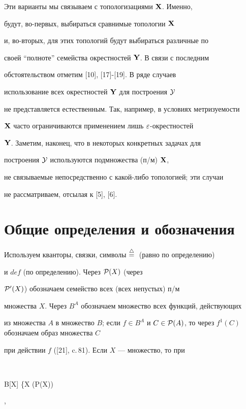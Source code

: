 Эти варианты мы связываем с топологизациями ${\bold X}$. Именно,


будут, во-первых, выбираться сравнимые топологии ${\bold X}$


и, во-вторых, для этих топологий будут выбираться различные по


своей ``полноте'' семейства окрестностей ${\bold Y}$. В связи с последним


обстоятельством отметим [10], [17]-[19]. В ряде случаев


использование всех окрестностей ${\bold Y}$ для построения ${\cal Y}$


не представляется естественным. Так, например, в условиях метризуемости


${\bold X}$ часто ограничиваются применением лишь $\varepsilon$-окрестностей


${\bold Y}$. Заметим, наконец, что в некоторых конкретных задачах для


построения ${\cal Y}$ используются подмножества (п/м) ${\bold X}$,


не связываемые непосредственно с какой-либо топологией; эти случаи


не рассматриваем, отсылая к [5], [6].





\section{Общие определения и обозначения}





Используем кванторы, связки, символы $\overset{\triangle}{=}{}$ (равно по определению)


и $def$ (по определению). Через ${{\cal P}(X)}$ (через


${{\cal P}'}(X)$) обозначаем семейство всех (всех непустых) п/м


множества $X$. Через $B^A$ обозначаем множество всех функций, действующих


из множества $A$ в множество $B$; если $f \in {B^A}$ и $C \in


{{\cal P}(A)}$, то через ${f^1}(C)$ обозначаем образ множества $C$


при действии $f$ ([21], c.\,81). Если $X$ --- множество, то при


$$


{{\cal B}[X]} \stac \{{\frak X} ({\cal P}(X)) \mid


 ,\  \  \in


